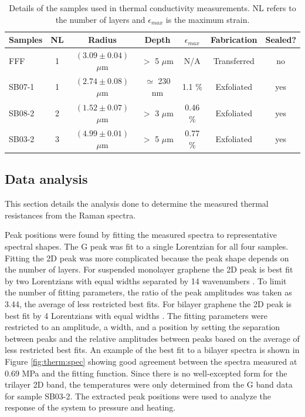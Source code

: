 \begin{table}
	\begin{center}
	\begin{tabular}{l c c c c c c}
		\hline
		\hline
		Samples & NL 	& Radius 					& Depth 		& $\epsilon_{max}$ & Fabrication 		& Sealed? \\
		\hline
		FFF		& 1 	& $(3.09 \pm 0.04)$ $\mu$m 	& $>$ 5 $\mu$m 	& N/A	& Transferred 	 	& no \\
		SB07-1	& 1 	& $(2.74 \pm 0.08)$ $\mu$m 	& $\simeq$ 230 nm & 1.1 \%	& Exfoliated 		& yes \\
		SB08-2	& 2 	& $(1.52 \pm 0.07)$ $\mu$m 	& $>$ 3 $\mu$m 	& 0.46 \%	& Exfoliated 		& yes \\
		SB03-2	& 3 	& $(4.99 \pm 0.01)$ $\mu$m 	& $>$ 5 $\mu$m 	& 0.77 \%	& Exfoliated 		& yes \\
		\hline
		\hline
	\end{tabular}
	\end{center}
	\caption[Samples used in thermal conductivity measurements]{\label{tab:therm:samples} 
	Details of the samples used in thermal conductivity measurements. NL refers to the number of layers and $\epsilon_{max}$ is the maximum strain.}
\end{table}

\subsection{Data analysis}
This section details the analysis done to determine the measured thermal resistances from the Raman spectra.

Peak positions were found by fitting the measured spectra to representative spectral shapes.
The G peak was fit to a single Lorentzian for all four samples.
Fitting the 2D peak was more complicated because the peak shape depends on the number of layers.
For suspended monolayer graphene the 2D peak is best fit by two Lorentzians with equal widths separated by 14 wavenumbers \cite{Berciaud2013}.
To limit the number of fitting parameters, the ratio of the peak amplitudes was taken as 3.44, the average of less restricted best fits.
For bilayer graphene the 2D peak is best fit by 4 Lorentzians with equal widths \cite{Ferrari2006,Malard2007}.
The fitting parameters were restricted to an amplitude, a width, and a position by setting the separation between peaks and the relative amplitudes between peaks based on the average of less restricted best fits.
An example of the best fit to a bilayer spectra is shown in Figure \ref{fig:therm:spec} showing good agreement between the spectra measured at 0.69 MPa and the fitting function.
Since there is no well-excepted form for the trilayer 2D band, the temperatures were only determined from the G band data for sample SB03-2.
The extracted peak positions were used to analyze the response of the system to pressure and heating.

